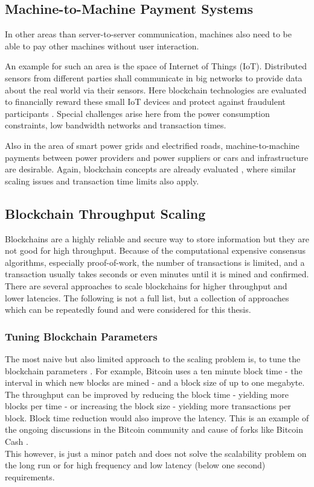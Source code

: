 \documentclass[a4paper,12pt]{scrartcl}
\begin{document}
\subsection{Machine-to-Machine Payment Systems}

In other areas than server-to-server communication, machines also need to be able to pay other machines without user interaction.

An example for such an area is the space of Internet of Things (IoT). Distributed sensors from different parties shall communicate in big networks to provide data about the real world via their sensors. Here blockchain technologies are evaluated to financially reward these small IoT devices and protect against fraudulent participants \cite{worner2017impact}. Special challenges arise here from the power consumption constraints, low bandwidth networks and transaction times.

Also in the area of smart power grids and electrified roads, machine-to-machine payments between power providers and power suppliers or cars and infrastructure are desirable. Again, blockchain concepts are already evaluated \cite{Hagstrom2017}, where similar scaling issues and transaction time limits also apply.

\subsection{Blockchain Throughput Scaling}

Blockchains are a highly reliable and secure way to store information but they are not good for high throughput. Because of the computational expensive consensus algorithms, especially proof-of-work, the number of transactions is limited, and a transaction usually takes seconds or even minutes until it is mined and confirmed.\\
There are several approaches to scale blockchains for higher throughput and lower latencies. The following is not a full list, but a collection of approaches which can be repeatedly found and were considered for this thesis.

\subsubsection{Tuning Blockchain Parameters}

The most naive but also limited approach to the scaling problem is, to tune the blockchain parameters \cite{Croman2017}. For example, Bitcoin uses a ten minute block time - the interval in which new blocks are mined - and a block size of up to one megabyte. The throughput can be improved by reducing the block time - yielding more blocks per time - or increasing the block size - yielding more transactions per block. Block time reduction would also improve the latency. This is an example of the ongoing discussions in the Bitcoin community and cause of forks like Bitcoin Cash \cite{web83}.\\
This however, is just a minor patch and does not solve the scalability problem on the long run or for high frequency and low latency (below one second) requirements.
\end{document}
